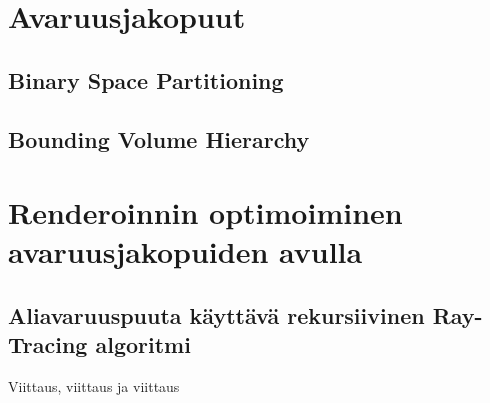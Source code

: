 \documentclass[a4paper,12pt, titlepage]{article}
\theoremstyle{break}
\theoremstyle{algostyle}
\begin{document}
\section{Avaruusjakopuut}
\subsection{Binary Space Partitioning}
\subsection{Bounding Volume Hierarchy}

\section{Renderoinnin optimoiminen avaruusjakopuiden avulla}
\subsection{Aliavaruuspuuta käyttävä rekursiivinen Ray-Tracing algoritmi}
Viittaus\cite{ranta}, viittaus\cite{hughes} ja viittaus\cite{janke}\cite{rules}\cite{fuchs}
\cite{appel}\cite{samet}



\end{document}
